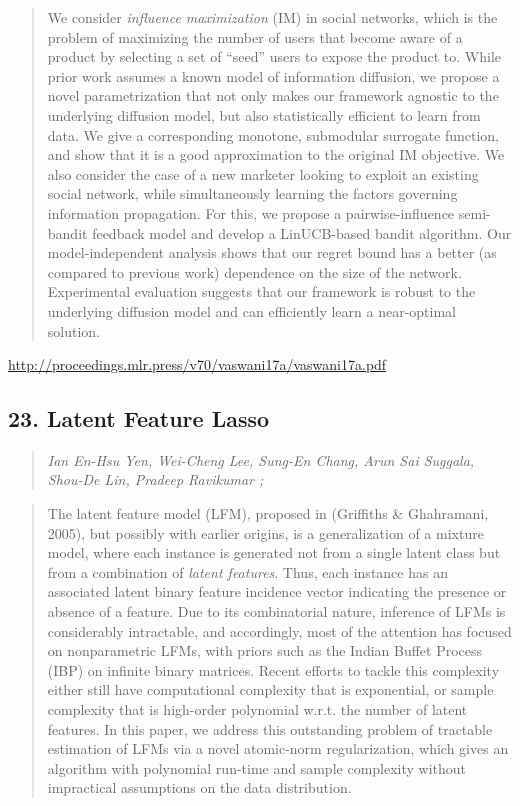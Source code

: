 \documentclass{article}
\begin{document}
\begin{quote}
    We consider \textit{influence maximization} (IM) in social networks, which is the problem of maximizing the number of users that become aware of a product by selecting a set of “seed” users to expose the product to. While prior work assumes a known model of information diffusion, we propose a novel parametrization that not only makes our framework agnostic to the underlying diffusion model, but also statistically efficient to learn from data. We give a corresponding monotone, submodular surrogate function, and show that it is a good approximation to the original IM objective. We also consider the case of a new marketer looking to exploit an existing social network, while simultaneously learning the factors governing information propagation. For this, we propose a pairwise-influence semi-bandit feedback model and develop a LinUCB-based bandit algorithm. Our model-independent analysis shows that our regret bound has a better (as compared to previous work) dependence on the size of the network. Experimental evaluation suggests that our framework is robust to the underlying diffusion model and can efficiently learn a near-optimal solution.  \end{quote}

\href{http://proceedings.mlr.press/v70/vaswani17a/vaswani17a.pdf}{http://proceedings.mlr.press/v70/vaswani17a/vaswani17a.pdf}

\subsection{23. Latent Feature Lasso}

\begin{quote}
\footnotesize{\textit{Ian En-Hsu Yen, Wei-Cheng Lee, Sung-En Chang, Arun Sai Suggala, Shou-De Lin, Pradeep Ravikumar ;}}
\end{quote}

\begin{quote}
    The latent feature model (LFM), proposed in (Griffiths \& Ghahramani, 2005), but possibly with earlier origins, is a generalization of a mixture model, where each instance is generated not from a single latent class but from a combination of \textit{latent features}. Thus, each instance has an associated latent binary feature incidence vector indicating the presence or absence of a feature. Due to its combinatorial nature, inference of LFMs is considerably intractable, and accordingly, most of the attention has focused on nonparametric LFMs, with priors such as the Indian Buffet Process (IBP) on infinite binary matrices. Recent efforts to tackle this complexity either still have computational complexity that is exponential, or sample complexity that is high-order polynomial w.r.t. the number of latent features. In this paper, we address this outstanding problem of tractable estimation of LFMs via a novel atomic-norm regularization, which gives an algorithm with polynomial run-time and sample complexity without impractical assumptions on the data distribution.  \end{quote}
\end{document}
